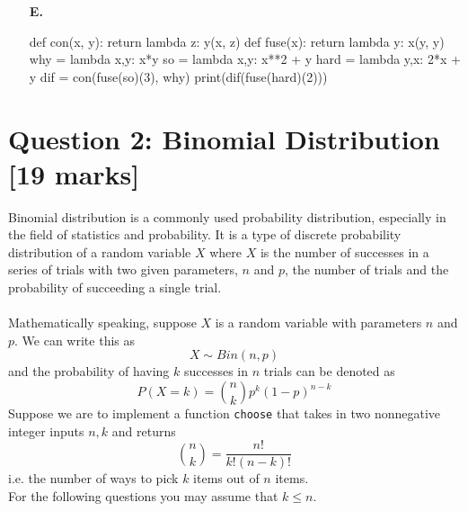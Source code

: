 \begin{multicols*}{2}
\begin{enumerate}
\item[\textbf{E.}]
\begin{python}
def con(x, y):
    return lambda z: y(x, z)
def fuse(x):
    return lambda y: x(y, y)
why = lambda x,y: x*y
so = lambda x,y: x**2 + y
hard = lambda y,x: 2*x + y
dif = con(fuse(so)(3), why)
print(dif(fuse(hard)(2)))
\end{python}
\begin{flushright}
    [5 marks]
\end{flushright}
\end{enumerate}
\end{multicols*}

\newpage
\section{Question 2: Binomial Distribution [19 marks]}
Binomial distribution is a commonly used probability distribution, especially in the field of statistics 
and probability. It is a type of discrete probability distribution of a random variable $X$ where $X$ 
is the number of successes in a series of trials with two given parameters, $n$ and $p$, the 
number of trials and the probability of succeeding a single trial. \\ \\
Mathematically speaking, suppose $X$ is a random variable with parameters $n$ and $p$. We can 
write this as
\[X \sim Bin(n,p)\]
and the probability of having $k$ successes in $n$ trials can be denoted as
\[P(X = k) = \binom{n}{k}p^k(1-p)^{n-k}\]
Suppose we are to implement a function \colorbox{CornflowerBlue!20}{\texttt{choose}} that takes in two nonnegative integer inputs $n, k$
and returns
\[\binom{n}{k} = \frac{n!}{k!(n-k)!}\]
i.e. the number of ways to pick $k$ items out of $n$ items. \\
For the following questions you may assume that $k \le n$.

